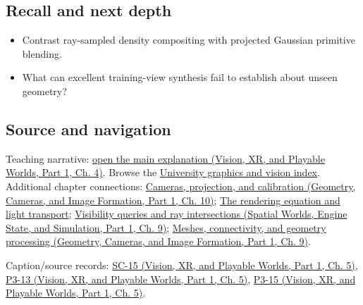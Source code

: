 \subsection{Recall and next depth}\label{appendix-c5b332e400e7-recall-and-next-depth}

\hypertarget{appendix-c5b332e400e7-recall-and-next-depth}{}

\begin{itemize}
\tightlist
\item
  Contrast ray-sampled density compositing with projected Gaussian primitive blending.
\item
  What can excellent training-view synthesis fail to establish about unseen geometry?
\end{itemize}

\subsection{Source and navigation}\label{appendix-c5b332e400e7-source-and-navigation}

\hypertarget{appendix-c5b332e400e7-source-and-navigation}{}

Teaching narrative: \href{../07-Vision-XR-and-Playable-Worlds-P01/main.pdf\#04-visual-computing-ii-ch034-learned-representations-of-3d-shape-and-scenes}{open the main explanation (Vision, XR, and Playable Worlds, Part 1, Ch. 4)}. Browse the \hyperref[appendix-a6d556a4ef50-university-graphics-vision-and-photography---independent-series]{University graphics and vision index}. Additional chapter connections: \href{../03-Geometry-Cameras-and-Image-Formation-P01/main.pdf\#03-visual-computing-i-ch003-cameras-projection-and-calibration}{Cameras, projection, and calibration (Geometry, Cameras, and Image Formation, Part 1, Ch. 10)}; \hyperref[03-visual-computing-i-ch007-the-rendering-equation-and-light-transport]{The rendering equation and light transport}; \href{../05-Spatial-Worlds-Engine-State-and-Simulation-P01/main.pdf\#04-visual-computing-ii-ch028-visibility-queries-and-ray-intersections-1}{Visibility queries and ray intersections (Spatial Worlds, Engine State, and Simulation, Part 1, Ch. 9)}; \href{../03-Geometry-Cameras-and-Image-Formation-P01/main.pdf\#03-visual-computing-i-ch002-meshes-connectivity-and-geometry-processing}{Meshes, connectivity, and geometry processing (Geometry, Cameras, and Image Formation, Part 1, Ch. 9)}.

Caption/source records: \href{../07-Vision-XR-and-Playable-Worlds-P01/main.pdf\#04-visual-computing-ii-ch036-sc-15---stanford-cs231n-deep-learning-for-computer-vision-spring-2025-lecture-15-3d-vision}{SC-15 (Vision, XR, and Playable Worlds, Part 1, Ch. 5)}, \href{../07-Vision-XR-and-Playable-Worlds-P01/main.pdf\#04-visual-computing-ii-ch036-p3-13---curves-and-surfaces}{P3-13 (Vision, XR, and Playable Worlds, Part 1, Ch. 5)}, \href{../07-Vision-XR-and-Playable-Worlds-P01/main.pdf\#04-visual-computing-ii-ch036-p3-15---ray-tracing}{P3-15 (Vision, XR, and Playable Worlds, Part 1, Ch. 5)}.
